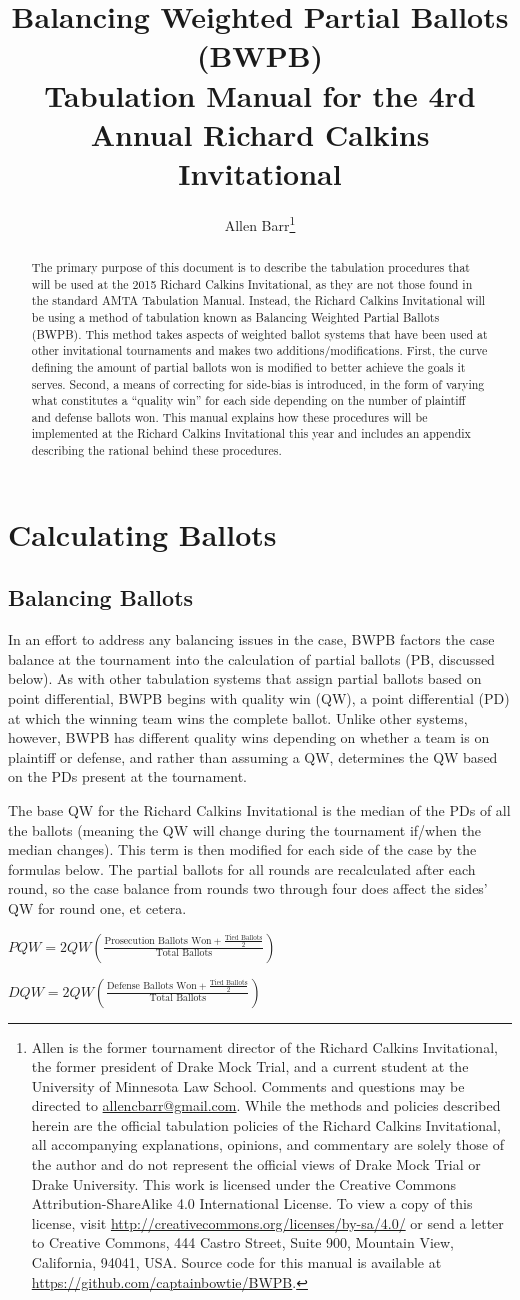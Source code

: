 \documentclass{article}
\title{\textbf{Balancing Weighted Partial Ballots (BWPB)}\\ \large  Tabulation Manual for the 4rd Annual Richard Calkins Invitational}
\author{Allen Barr\footnote{Allen is the former tournament director of the Richard Calkins Invitational, the former president of Drake Mock Trial, and a current student at the University of Minnesota Law School.  Comments and questions may be directed to \href{mailto:allencbarr@gmail.com}{allencbarr@gmail.com}.  While the methods and policies described herein are the official tabulation policies of the Richard Calkins Invitational, all accompanying explanations, opinions, and commentary are solely those of the author and do not represent the official views of Drake Mock Trial  or Drake University.  This work is licensed under the Creative Commons Attribution-ShareAlike 4.0 International License. To view a copy of this license, visit \url{http://creativecommons.org/licenses/by-sa/4.0/} or send a letter to Creative Commons, 444 Castro Street, Suite 900, Mountain View, California, 94041, USA. Source code for this manual is available at \url{https://github.com/captainbowtie/BWPB}.}}
\begin{document}
\maketitle
\begin{abstract}
The primary purpose of this document is to describe the tabulation procedures that will be used at the 2015 Richard Calkins Invitational, as they are not those found in the standard AMTA Tabulation Manual.  Instead, the Richard Calkins Invitational will be using a method of tabulation known as Balancing Weighted Partial Ballots (BWPB).  This method takes aspects of weighted ballot systems that have been used at other invitational tournaments and makes two additions/modifications.  First, the curve defining the amount of partial ballots won is modified to better achieve the goals it serves.  Second, a means of correcting for side-bias is introduced, in the form of varying what constitutes a ``quality win'' for each side depending on the number of plaintiff and defense ballots won.  This manual explains how these procedures will be implemented at the Richard Calkins Invitational this year and includes an appendix describing the rational behind these procedures.
\end{abstract}
\section{Calculating Ballots}
\subsection{Balancing Ballots}
In an effort to address any balancing issues in the case, BWPB factors the case balance at the tournament into the calculation of partial ballots (PB, discussed below). As with other tabulation systems that assign partial ballots based on point differential, BWPB begins with quality win (QW), a point differential (PD) at which the winning team wins the complete ballot. Unlike other systems, however, BWPB has different quality wins depending on whether a team is on plaintiff or defense, and rather than assuming a QW, determines the QW based on the PDs present at the tournament.

The base QW for the Richard Calkins Invitational is the median of the PDs of all the ballots (meaning the QW will change during the tournament if/when the median changes). This term is then modified for each side of the case by the formulas below. The partial ballots for all rounds are recalculated after each round, so the case balance from rounds two through four does affect the sides' QW for round one, et cetera.
\begin{center}
$PQW=2QW\left(\frac{\mbox{Prosecution Ballots Won}+\frac{\mbox{Tied Ballots}}{2}}{\mbox{Total Ballots}}\right)$

$DQW=2QW\left(\frac{\mbox{Defense Ballots Won}+\frac{\mbox{Tied Ballots}}{2}}{\mbox{Total Ballots}}\right)$
\end{center}
\end{document}
